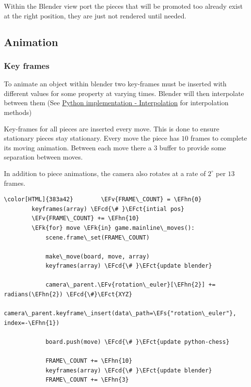 \documentclass[11pt]{article}
\newcommand{\EFk}[1]{\textcolor{EFk}{#1}} %
\newcommand{\EFs}[1]{\textcolor{EFs}{#1}} %
\newcommand{\EFct}[1]{\textcolor{EFct}{#1}} %
\newcommand{\EFv}[1]{\textcolor{EFv}{#1}} %
\newcommand{\EFcd}[1]{\textcolor{EFcd}{#1}} %
\newcommand{\EFhn}[1]{\textcolor{EFhn}{\textbf{#1}}} %
\begin{document}
Within the Blender view port the pieces that will be promoted too already exist
at the right position, they are just not rendered until needed.
\subsection{Animation}
\label{sec:orgbb0100e}
\subsubsection{Key frames}
\label{sec:org4c34590}
To animate an object within blender two key-frames must be inserted with
different values for some property at varying times. Blender will then
interpolate between them (See \hyperref[sec:org3e8ac5b]{Python implementation - Interpolation} for
interpolation methods)

Key-frames for all pieces are inserted every move. This is done to ensure
stationary pieces stay stationary. Every move the piece has \(10\) frames to
complete its moving animation. Between each move there a \(3\) buffer to provide
some separation between moves.

In addition to piece animations, the camera also rotates at a rate of
\(2^{\circ}\) per \(13\) frames.
\begin{Code}
\begin{Verbatim}[]
\color[HTML]{383a42}        \EFv{FRAME\_COUNT} = \EFhn{0}
        keyframes(array) \EFcd{\# }\EFct{intial pos}
        \EFv{FRAME\_COUNT} += \EFhn{10}
        \EFk{for} move \EFk{in} game.mainline\_moves():
            scene.frame\_set(FRAME\_COUNT)

            make\_move(board, move, array)
            keyframes(array) \EFcd{\# }\EFct{update blender}

            camera\_parent.\EFv{rotation\_euler}[\EFhn{2}] += radians(\EFhn{2}) \EFcd{\#}\EFct{XYZ}
            camera\_parent.keyframe\_insert(data\_path=\EFs{"rotation\_euler"}, index=-\EFhn{1})

            board.push(move) \EFcd{\# }\EFct{update python-chess}

            FRAME\_COUNT += \EFhn{10}
            keyframes(array) \EFcd{\# }\EFct{update blender}
            FRAME\_COUNT += \EFhn{3}
\end{Verbatim}
\end{Code}
\end{document}
